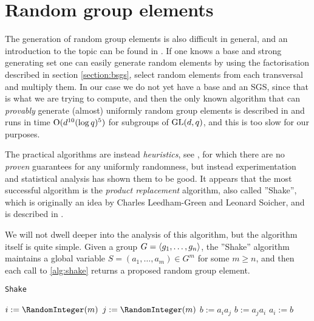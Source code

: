 \section{Random group elements}

The generation of random group elements is also difficult in general,
and an introduction to the topic can be found in \cite{babai96}. If
one knows a base and strong generating set one can easily generate
random elements by using the factorisation described in section
\ref{section:bsgs}, select random elements from each transversal and
multiply them. In our case we do not yet have a base and an SGS, since that is what we are trying to compute, and
then the only known algorithm that can \emph{provably} generate (almost)
uniformly random group elements is described in \cite{babai91} and
runs in time $\operatorname{O} ( d^{10} (\log{q})^5 )$ for subgroups of $\operatorname{GL}(d, q)$, and
this is too slow for our purposes.

The practical algorithms are instead \emph{heuristics}, see
\cite{kann99}, for which there are no \emph{proven} guarantees for any
uniformly randomness, but instead experimentation and statistical
analysis has shown them to be good. It appears that the most
successful algorithm is the \emph{product replacement} algorithm, also
called ''Shake'', which is originally an idea by Charles Leedham-Green and
Leonard Soicher, and is described in \cite{lg95}. 

We will not dwell deeper into the analysis of this algorithm, but
the algorithm itself is quite simple. Given a group $G =
\left\langle g_1, \dotsc, g_n \right\rangle$, the ''Shake'' algorithm maintains a global
variable $S = (a_1, \dotsc, a_m) \in G^m$ for some $m \geq n$, and
then each call to \ref{alg:shake} returns a proposed random group
element.
\begin{algorithm} 
\dontprintsemicolon
\caption{\texttt{Shake}}



\Begin
{
  $i := \RandomInteger(m)$ \;
  {
    $j := \RandomInteger(m)$ \;
  }
  {
    $b := a_i a_j$ \;
  }
  {
    $b  := a_j a_i$ \;
  }
  $a_i := b$ \;
}
\label{alg:shake}
\end{algorithm}

